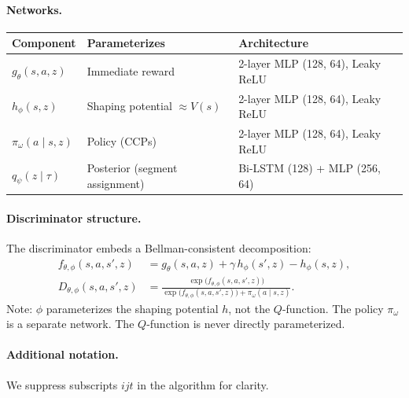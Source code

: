 \documentclass[11pt]{article}
\begin{document}
\paragraph{Networks.}\leavevmode
\vspace{-0.5em}

\begin{table}[h]
\centering\small
\begin{tabular}{lll}
\toprule
Component & Parameterizes & Architecture \\
\midrule
$g_\theta(s, a, z)$ & Immediate reward & 2-layer MLP (128, 64), Leaky ReLU \\
$h_\phi(s, z)$ & Shaping potential $\approx V(s)$ & 2-layer MLP (128, 64), Leaky ReLU \\
$\pi_\omega(a \mid s, z)$ & Policy (CCPs) & 2-layer MLP (128, 64), Leaky ReLU \\
$q_\psi(z \mid \tau)$ & Posterior (segment assignment) & Bi-LSTM (128) + MLP (256, 64) \\
\bottomrule
\end{tabular}
\end{table}

\vspace{-0.5em}
\paragraph{Discriminator structure.} The discriminator embeds a Bellman-consistent decomposition:
\begin{align}
f_{\theta,\phi}(s, a, s', z) &= g_\theta(s, a, z) + \gamma\, h_\phi(s', z) - h_\phi(s, z), \label{eq:f}\\[2pt]
D_{\theta,\phi}(s, a, s', z) &= \frac{\exp\!\big(f_{\theta,\phi}(s, a, s', z)\big)}{\exp\!\big(f_{\theta,\phi}(s, a, s', z)\big) + \pi_\omega(a \mid s, z)}. \label{eq:D}
\end{align}
Note: $\phi$ parameterizes the shaping potential $h$, not the $Q$-function. The policy $\pi_\omega$ is a separate network. The $Q$-function is never directly parameterized.

\paragraph{Additional notation.} We suppress subscripts $ijt$ in the algorithm for clarity.
\vspace{-0.5em}
\end{document}
